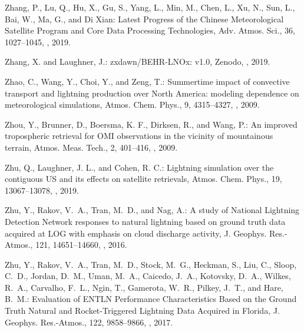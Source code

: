 \documentclass[amt]{copernicus}
\begin{document}
\begin{thebibliography}{105}
Zhang, P., Lu, Q., Hu, X., Gu, S., Yang, L., Min, M., Chen, L., Xu, N., Sun,
  L., Bai, W., Ma, G., and {Di Xian}: Latest Progress of the Chinese
  Meteorological Satellite Program and Core Data Processing Technologies,
  Adv. Atmos. Sci., 36, 1027--1045,
  , 2019.

Zhang, X. and Laughner, J.: zxdawn/BEHR-LNOx: v1.0, Zenodo,
, 2019.

 Zhao, C., Wang, Y., Choi, Y., and Zeng, T.: Summertime impact of convective transport and lightning  production over North America: modeling dependence on meteorological simulations, Atmos. Chem. Phys., 9, 4315–4327, , 2009.

Zhou, Y., Brunner, D., Boersma, K. F., Dirksen, R., and Wang, P.: An improved tropospheric  retrieval for OMI observations in the vicinity of mountainous terrain, Atmos. Meas. Tech., 2, 401–416, , 2009.

Zhu, Q., Laughner, J. L., and Cohen, R. C.: Lightning  simulation over the contiguous US and its effects on satellite  retrievals, Atmos. Chem. Phys., 19, 13067–13078, , 2019.

Zhu, Y., Rakov, V.~A., Tran, M.~D., and Nag, A.: A study of National Lightning
  Detection Network responses to natural lightning based on ground truth data
  acquired at LOG with emphasis on cloud discharge activity, J. Geophys. Res.-Atmos., 121, 14651--14660,
  , 2016.

Zhu, Y., Rakov, V.~A., Tran, M.~D., Stock, M.~G., Heckman, S., Liu, C., Sloop,
  C.~D., Jordan, D.~M., Uman, M.~A., Caicedo, J.~A., Kotovsky, D.~A., Wilkes,
  R.~A., Carvalho, F.~L., Ngin, T., Gamerota, W.~R., Pilkey, J.~T., and Hare,
  B.~M.: Evaluation of ENTLN Performance Characteristics Based on the Ground
  Truth Natural and Rocket-Triggered Lightning Data Acquired in Florida,
  J. Geophys. Res.-Atmos., 122, 9858--9866,
  , 2017.



\end{thebibliography}
\end{document}
